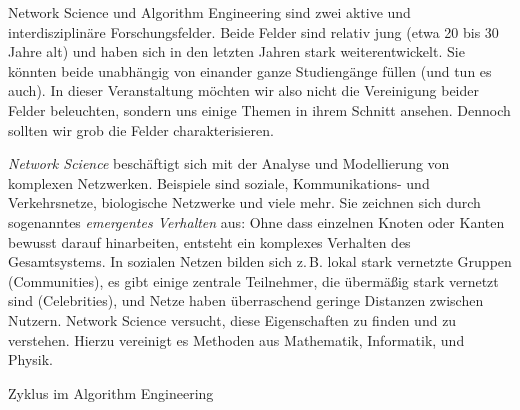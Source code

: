 \glqq Network Science\grqq{} und \glqq Algorithm Engineering\grqq{} sind zwei aktive und interdisziplinäre Forschungsfelder.
Beide Felder sind relativ jung (etwa 20 bis 30 Jahre alt) und haben sich in den letzten Jahren stark weiterentwickelt.
Sie könnten beide unabhängig von einander ganze Studiengänge füllen (und tun es auch).
In dieser Veranstaltung möchten wir also nicht die Vereinigung beider Felder beleuchten, sondern uns einige Themen in ihrem Schnitt ansehen.
Dennoch sollten wir grob die Felder charakterisieren.

\emph{Network Science} beschäftigt sich mit der Analyse und Modellierung von komplexen Netzwerken.
Beispiele sind soziale, Kommunikations- und Verkehrsnetze, biologische Netzwerke und viele mehr.
Sie zeichnen sich durch sogenanntes \emph{emergentes Verhalten} aus: Ohne dass einzelnen Knoten oder Kanten bewusst darauf hinarbeiten, entsteht ein komplexes Verhalten des Gesamtsystems.
In sozialen Netzen bilden sich z.\,B. lokal stark vernetzte Gruppen (Communities), es gibt einige zentrale Teilnehmer, die übermäßig stark vernetzt sind (Celebrities), und Netze haben überraschend geringe Distanzen zwischen Nutzern.
Network Science versucht, diese Eigenschaften zu finden und zu verstehen.
Hierzu vereinigt es Methoden aus Mathematik, Informatik, und Physik.

\begin{marginfigure}
    \caption{Zyklus im Algorithm Engineering}
    \label{fig:intro/algorithm-engineering}
\end{marginfigure}

